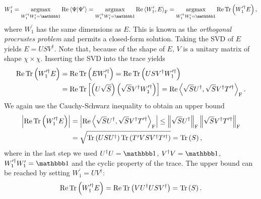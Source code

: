\begin{equation}
	\label{eq:disoTPS_YB_move_optimization_problem_W_1_prime}
	W_1^\prime = \underset{W_1^{\prime\dagger}W_1^\prime = \id}{\text{argmax}}\Re\left\langle\Psi\middle|\Psi^\prime\right\rangle = \underset{W_1^{\prime\dagger}W_1^\prime = \id}{\text{argmax}} \Re\left\langle W_1^\prime, E \right\rangle_\text{F} = \underset{W_1^{\prime\dagger}W_1^\prime = \id}{\text{argmax}} \Re\Tr\left(W_1^{\prime\dagger}E\right),
\end{equation}
where $W_1^\prime$ has the same dimensions as $E$. This is known as the \textit{orthogonal procrustes problem} and permits a closed-form solution.  Taking the SVD of $E$ yields $E = USV^\dagger$. Note that, because of the shape of $E$, $V$ is a unitary matrix of shape $\chi\times\chi$. Inserting the SVD into the trace yields
\begin{equation}
	\begin{split}
		\operatorname{Re}\operatorname{Tr}\left(W_1^{\prime\dagger}E\right) &= \operatorname{Re}\operatorname{Tr}\left(E W_1^{\prime\dagger}\right) = \operatorname{Re}\operatorname{Tr}\left(USV^\dagger W_1^{\prime\dagger}\right)\\
		&= \operatorname{Re}\operatorname{Tr}\left[\left(U\sqrt{S}\right)\left(\sqrt{S}V^\dagger W_1^{\prime\dagger}\right)\right] = \operatorname{Re}\left\langle\sqrt{S}U^\dagger,\sqrt{S}V^\dagger T^{\prime\dagger}\right\rangle_\text{F}.
	\end{split}
\end{equation}
We again use the Cauchy-Schwarz inequality to obtain an upper bound
\begin{equation}
	\begin{split}
		\left|\operatorname{Re}\operatorname{Tr}\left(W_1^{\prime\dagger}E\right)\right| &= \left|\operatorname{Re}\left\langle\sqrt{S}U^\dagger,\sqrt{S}V^\dagger T^{\prime\dagger}\right\rangle_\text{F}\right| \le \left\lVert\sqrt{S}U^\dagger\right\rVert_\text{F} \left\lVert\sqrt{S}V^\dagger T^{\prime\dagger}\right\rVert_\text{F}\\
		&= \sqrt{\operatorname{Tr}\left(USU^\dagger\right)\operatorname{Tr}\left(T^\prime VSV^\dagger T^{\prime\dagger}\right)} = \operatorname{Tr}\left(S\right),		
	\end{split}
\end{equation}
where in the last step we used $U^\dagger U = \id$, $V^\dagger V = \id$, $W_1^{\prime\dagger}W_1^\prime = \id$ and the cyclic property of the trace. The upper bound can be reached by setting $W_1^\prime = UV^\dagger$:
\begin{equation}
	\operatorname{Re}\operatorname{Tr}\left(W_1^{\prime\dagger}E\right) = \operatorname{Re}\operatorname{Tr}\left(VU^\dagger USV^\dagger\right) = \operatorname{Tr}\left(S\right).
\end{equation}
